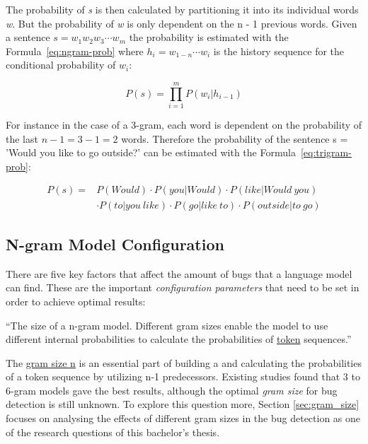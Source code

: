 The probability of \textit{s} is then calculated by partitioning it into its individual words \textit{w}. But the probability of \textit{w} is only dependent on the n - 1 previous words. Given a sentence \( s = w_1w_2w_3\cdots w_m \) the probability is estimated with the Formula~\ref{eq:ngram-prob} where \(h_i = w_{1-n}\cdots w_i \) is the history sequence for the conditional probability of \(w_i\):

\begin{equation} \label{eq:ngram-prob}
P(s) ={} \displaystyle\prod_{i=1}^{m} P(w_i|h_{i-1})
\end{equation}

For instance in the case of a 3-gram, each word is dependent on the probability of the last \(n - 1 = 3 - 1 = 2 \) words. Therefore the probability of the sentence s = 'Would you like to go outside?' can be estimated with the Formula~\ref{eq:trigram-prob}:

\begin{equation}\label{eq:trigram-prob}
\begin{aligned}
P(s) ={} & P(Would)\cdot P(you|Would)\cdot P(like|Would\ you) \\ 
		 & \cdot P(to|you\ like)\cdot P(go|like\ to)\cdot P(outside|to\ go)
\end{aligned}
\end{equation} 
  
\subsection{N-gram Model Configuration}\label{subsec:configuration}
There are five key factors that affect the amount of bugs that a language model can find. These are the important \textit{configuration parameters} that need to be set in order to achieve optimal results:  

\begin{definition}\label{def:gram_size}
    ``The size of a n-gram model. Different gram sizes enable the model to use different internal probabilities to calculate the probabilities of \hyperref[def:token]{token} sequences.''~\cite{bugram}
\end{definition}

The \hyperref[def:gram_size]{gram size n} is an essential part of building a \ngram{} and calculating the probabilities of a token sequence by utilizing n-1 predecessors. Existing studies found that 3 to 6-gram models gave the best results, although the optimal \textit{gram size} for bug detection is still unknown. To explore this question more, Section \ref{sec:gram_size} focuses on analysing the effects of different gram sizes in the \scratch{} bug detection as one of the research questions of this bachelor's thesis.

